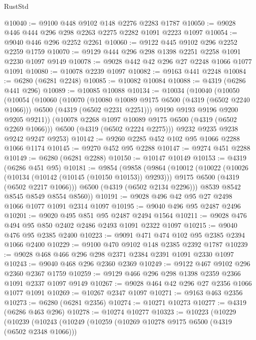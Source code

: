 \begin{lexlean}{RustStd}
\begin{coremodule}
@10040 := @9100 @448 @9102 @148 @2276 @2283 @1787
@10050 := @9028 @446 @444 @296 @298 @2263 @2275 @2282 @1091 @2223 @1097
@10054 := @9040 @446 @296 @2252 @2261
@10060 := @9122 @445 @9102 @296 @2252 @2259 @1759
@10070 := @9129 @444 @296 @298 @1398 @2251 @2258 @1091 @2230 @1097 @9149
@10078 := @9028 @442 @42 @296 @27 @2248 @1066 @1077 @1091
@10080 := @10078 @2239 @1097
@10082 := @9163 @441 @2248
@10084 := @6280 (@6281 @2248)
@10085 := @10082 @10084
@10088 := @4319 (@6286 @441 @296)
@10089 := @10085 @10088
@10134 := @10034
    (@10040
      (@10050
        (@10054
          (@10060
            (@10070
              (@10080 @10089 @9175 @6500 (@4319 (@6502 @2240 @1066)))
              @6500
              (@4319 (@6502 @2231 @2251)))
            @9190
            @9193
            @9196
            @9200
            @9205
            @9211))
        (@10078 @2268 @1097 @10089 @9175 @6500 (@4319 (@6502 @2269 @1066)))
        @6500
        (@4319 (@6502 @2224 @2275)))
      @9232
      @9235
      @9238
      @9242
      @9247
      @9253)
@10142 := @9260 @2285 @452 @102 @95 @1066 @2288 @1066 @1174
@10145 := @9270 @452 @95 @2288
@10147 := @9274 @451 @2288
@10149 := @6280 (@6281 @2288)
@10150 := @10147 @10149
@10153 := @4319 (@6286 @451 @95)
@10181 := @9854
    (@9858
      (@9864
        (@10012
          (@10022
            (@10026 (@10134 (@10142 (@10145 (@10150 @10153)) @9293)))
            @9175
            @6500
            (@4319 (@6502 @2217 @1066)))
          @6500
          (@4319 (@6502 @2134 @2296)))
        @8539
        @8542
        @8545
        @8549
        @8554
        @8560))
@10191 := @9028 @496 @42 @95 @27 @2498 @1066 @1077 @1091 @2314 @1097
@10195 := @9040 @496 @95 @2487 @2496
@10201 := @9020 @495 @851 @95 @2487 @2494 @1564
@10211 := @9028 @476 @494 @95 @850 @2402 @2486 @2493 @1091 @2322 @1097
@10215 := @9040 @476 @95 @2385 @2400
@10223 := @9091 @471 @474 @102 @95 @2385 @2394 @1066 @2400
@10229 := @9100 @470 @9102 @148 @2385 @2392 @1787
@10239 := @9028 @468 @466 @296 @298 @2371 @2384 @2391 @1091 @2330 @1097
@10243 := @9040 @468 @296 @2360 @2369
@10249 := @9122 @467 @9102 @296 @2360 @2367 @1759
@10259 := @9129 @466 @296 @298 @1398 @2359 @2366 @1091 @2337 @1097 @9149
@10267 := @9028 @464 @42 @296 @27 @2356 @1066 @1077 @1091
@10269 := @10267 @2347 @1097
@10271 := @9163 @463 @2356
@10273 := @6280 (@6281 @2356)
@10274 := @10271 @10273
@10277 := @4319 (@6286 @463 @296)
@10278 := @10274 @10277
@10323 := @10223
    (@10229
      (@10239
        (@10243
          (@10249
            (@10259
              (@10269 @10278 @9175 @6500 (@4319 (@6502 @2348 @1066)))

\end{coremodule}
\end{lexlean}
